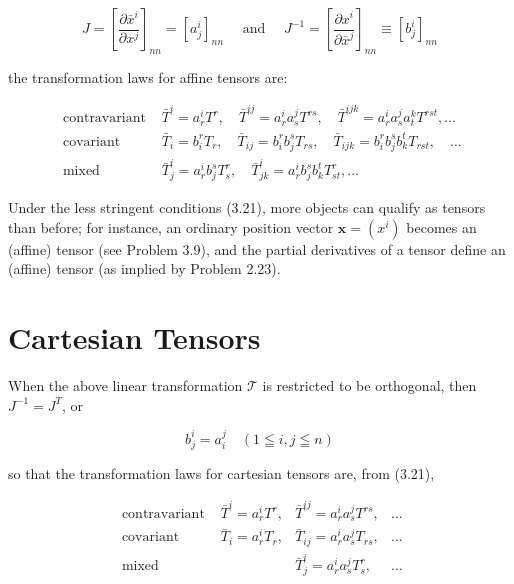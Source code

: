 \documentclass[10pt]{article}
\begin{document}
\begin{equation*}
J=\left[\frac{\partial \bar{x}^{i}}{\partial x^{j}}\right]_{n n}=\left[a_{j}^{i}\right]_{n n} \quad \text { and } \quad J^{-1}=\left[\frac{\partial x^{i}}{\partial \bar{x}^{j}}\right]_{n n} \equiv\left[b_{j}^{i}\right]_{n n} \tag{3.20}
\end{equation*}


the transformation laws for affine tensors are:

\[
\begin{array}{rll}
\text { contravariant } & \bar{T}^{i}=a_{r}^{i} T^{r}, \quad \bar{T}^{i j}=a_{r}^{i} a_{s}^{j} T^{r s}, \quad \bar{T}^{i j k}=a_{r}^{i} a_{s}^{j} a_{t}^{k} T^{r s t}, \ldots \\
\text { covariant } & \bar{T}_{i}=b_{i}^{r} T_{r}, \quad \bar{T}_{i j}=b_{i}^{r} b_{j}^{s} T_{r s}, \quad \bar{T}_{i j k}=b_{i}^{r} b_{j}^{s} b_{k}^{t} T_{r s t}, \quad \ldots  \tag{3.21}\\
\text { mixed } & \bar{T}_{j}^{i}=a_{r}^{i} b_{j}^{s} T_{s}^{r}, \quad \bar{T}_{j k}^{i}=a_{r}^{i} b_{j}^{s} b_{k}^{t} T_{s t}^{r}, \ldots
\end{array}
\]

Under the less stringent conditions (3.21), more objects can qualify as tensors than before; for instance, an ordinary position vector $\mathbf{x}=\left(x^{i}\right)$ becomes an (affine) tensor (see Problem 3.9), and the partial derivatives of a tensor define an (affine) tensor (as implied by Problem 2.23).

\section*{Cartesian Tensors}
When the above linear transformation $\mathscr{T}$ is restricted to be orthogonal, then $J^{-1}=J^{T}$, or

$$
b_{j}^{i}=a_{i}^{j} \quad(1 \leqq i, j \leqq n)
$$

so that the transformation laws for cartesian tensors are, from (3.21),

$$
\begin{array}{rlll}
\text { contravariant } & \bar{T}^{i}=a_{r}^{i} T^{r}, & \bar{T}^{i j}=a_{r}^{i} a_{s}^{j} T^{r s}, & \ldots \\
\text { covariant } & \bar{T}_{i}=a_{r}^{i} T_{r}, & \bar{T}_{i j}=a_{r}^{i} a_{s}^{j} T_{r s}, & \ldots \\
\text { mixed } & & \bar{T}_{j}^{i}=a_{r}^{i} a_{s}^{j} T_{s}^{r}, & \ldots
\end{array}
$$
\end{document}

